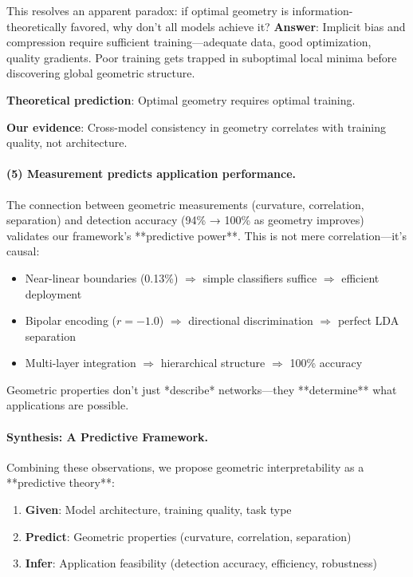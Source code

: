 \documentclass[11pt]{article}
\begin{document}
This resolves an apparent paradox: if optimal geometry is information-theoretically favored, why don't all models achieve it? \textbf{Answer}: Implicit bias and compression require sufficient training—adequate data, good optimization, quality gradients. Poor training gets trapped in suboptimal local minima before discovering global geometric structure.

\textbf{Theoretical prediction}: Optimal geometry requires optimal training.

\textbf{Our evidence}: Cross-model consistency in geometry correlates with training quality, not architecture.

\paragraph{(5) Measurement predicts application performance.}
The connection between geometric measurements (curvature, correlation, separation) and detection accuracy (94\% → 100\% as geometry improves) validates our framework's **predictive power**. This is not mere correlation—it's causal:

\begin{itemize}
\item Near-linear boundaries (0.13\%) $\Rightarrow$ simple classifiers suffice $\Rightarrow$ efficient deployment
\item Bipolar encoding ($r=-1.0$) $\Rightarrow$ directional discrimination $\Rightarrow$ perfect LDA separation  
\item Multi-layer integration $\Rightarrow$ hierarchical structure $\Rightarrow$ 100\% accuracy
\end{itemize}

Geometric properties don't just *describe* networks—they **determine** what applications are possible.

\paragraph{Synthesis: A Predictive Framework.}
Combining these observations, we propose geometric interpretability as a **predictive theory**:

\begin{enumerate}
\item \textbf{Given}: Model architecture, training quality, task type
\item \textbf{Predict}: Geometric properties (curvature, correlation, separation)
\item \textbf{Infer}: Application feasibility (detection accuracy, efficiency, robustness)
\end{enumerate}
\end{document}
